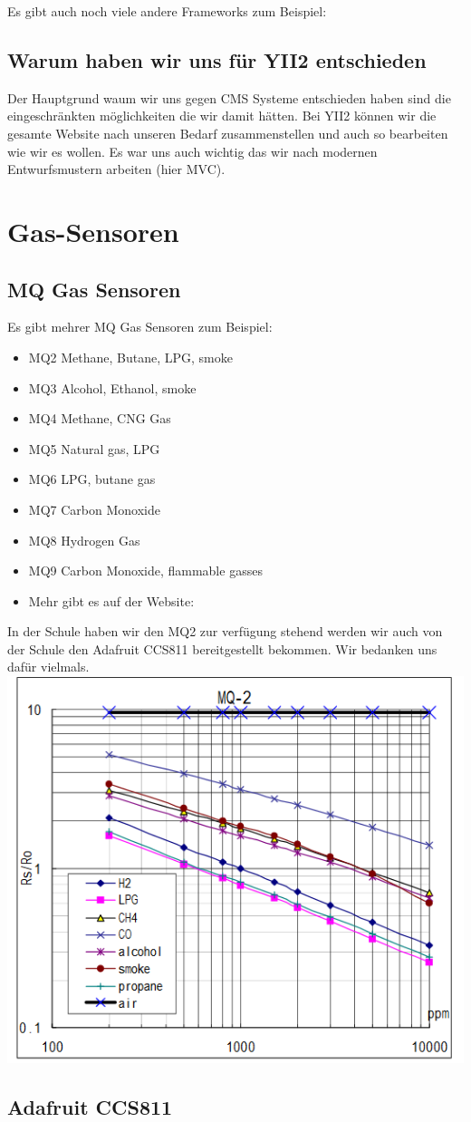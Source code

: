 Es gibt auch noch viele andere Frameworks zum Beispiel:

\subsection{Warum haben wir uns für YII2 entschieden}

Der Hauptgrund waum wir uns gegen CMS Systeme entschieden haben sind die eingeschränkten möglichkeiten die wir damit hätten. Bei YII2 können wir die gesamte Website nach unseren Bedarf zusammenstellen und auch so bearbeiten wie wir es wollen. Es war uns auch wichtig das wir nach modernen Entwurfsmustern arbeiten (hier MVC).





\newpage
\section{Gas-Sensoren}
\subsection{MQ Gas Sensoren}
Es gibt mehrer MQ Gas Sensoren zum Beispiel:
\begin{itemize}
\item {MQ2}
	Methane, Butane, LPG, smoke
\item {MQ3}
	Alcohol, Ethanol, smoke
\item {MQ4}
	Methane, CNG Gas
\item {MQ5}
	Natural gas, LPG
\item {MQ6}
	LPG, butane gas
\item {MQ7}
	Carbon Monoxide
\item {MQ8}
	Hydrogen Gas
\item {MQ9}
	Carbon Monoxide, flammable gasses
\item Mehr gibt es auf der Website: \cite{Gas}
\end{itemize}
In der Schule haben wir den MQ2 zur verfügung stehend werden wir auch von der Schule den Adafruit CCS811 bereitgestellt bekommen. Wir bedanken uns dafür vielmals.
\newline
{\includegraphics[width=0.8\linewidth]{figures/DatasheetMQ2.png}}{\cite{Datasheet}}
\cite{Gas}
\subsection{Adafruit CCS811}

